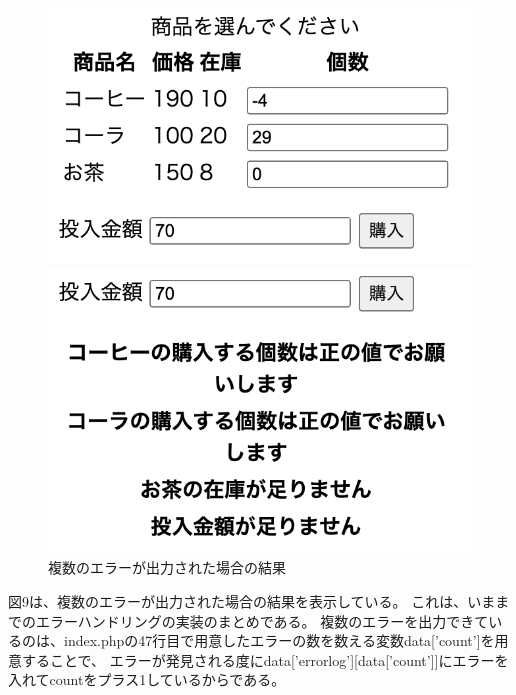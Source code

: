 \documentclass[12pt]{jarticle}
\begin{document}
\begin{figure}[h]
    \begin{minipage}{0.5\hsize}
        \begin{center}
            \includegraphics[scale=0.4]{kadai2_2_10.png}
        \end{center}
    \end{minipage}
    \begin{minipage}{0.5\hsize}
        \begin{center}
            \includegraphics[scale=0.4]{kadai2_2_11.png}
        \end{center}
    \end{minipage}
    \caption{複数のエラーが出力された場合の結果}
\end{figure}

図9は、複数のエラーが出力された場合の結果を表示している。
これは、いままでのエラーハンドリングの実装のまとめである。
複数のエラーを出力できているのは、index.phpの47行目で用意したエラーの数を数える変数data['count']を用意することで、
エラーが発見される度にdata['errorlog'][data['count']]にエラーを入れてcountをプラス1しているからである。
\end{document}
